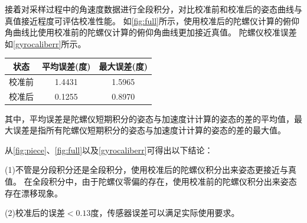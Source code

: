 \documentclass[
  type=master
]{gdutthesis}
\begin{document}
接着对采样过程中的角速度数据进行全段积分，对比校准前和校准后的姿态曲线与真值接近程度可评估校准性能。
如\autoref{fig:full}所示，使用校准后的陀螺仪计算的俯仰角曲线比使用校准前的陀螺仪计算的俯仰角曲线更加接近真值。
陀螺仪校准误差如\autoref{gyrocaliberr}所示。
\begin{table}[H]
	\label{gyrocaliberr}
	\begin{tabular}{ccc}
		\toprule
		状态 & 平均误差(度) & 最大误差(度) \\
		\midrule
		校准前 & 1.4431 & 1.5965 \\
		校准后 & 0.1255 & 0.8970 \\
		\bottomrule
	\end{tabular}
\end{table}
其中，平均误差是陀螺仪短期积分的姿态与加速度计计算的姿态的差的平均值，最大误差是指所有陀螺仪短期积分的姿态与加速度计计算的姿态的差的最大值。

从\autoref{fig:piece}、\autoref{fig:full}以及\autoref{gyrocaliberr}可得出以下结论：

(1)不管是分段积分还是全段积分，使用校准后的陀螺仪积分出来姿态更接近与真值。
在全段积分中，由于陀螺仪零偏的存在，使用校准前的陀螺仪积分出来姿态存在漂移现象。

(2)校准后的误差$<0.13$度，传感器误差可以满足实际使用要求。
\end{document}
